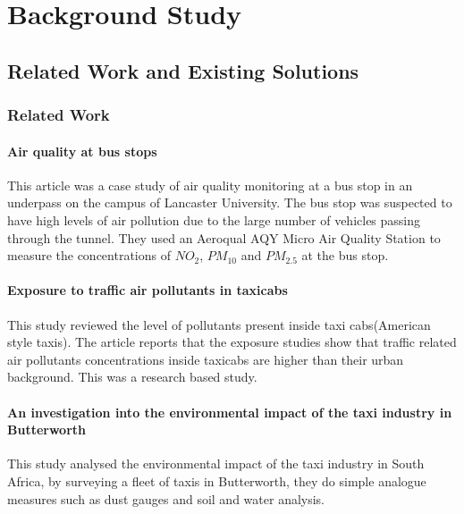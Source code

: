 \chapter{Background Study}



\section{Related Work and Existing Solutions}
\subsection{Related Work}

\subsubsection{Air quality at bus stops \cite{busstop}}
This article was a case study of air quality monitoring at a bus stop in an underpass on the campus of Lancaster University. The bus stop was suspected to have high levels of air pollution due to the large number of vehicles passing through the tunnel. They used an Aeroqual AQY Micro Air Quality Station to measure the concentrations of $NO_2$, $PM_{10}$ and $PM_{2.5}$ at the bus stop. 




\subsubsection{Exposure to traffic air pollutants in taxicabs \cite{insidetaxismall}}
This study reviewed the level of pollutants present inside taxi cabs(American style taxis). The article reports that the exposure studies show that traffic related air pollutants concentrations inside taxicabs are higher than their urban background. This was a research based study.

\subsubsection{An investigation into the environmental impact of the taxi industry in Butterworth \cite{Environmentalimpact}}
This study analysed the environmental impact of the taxi industry in South Africa, by surveying a fleet of taxis in Butterworth, they do simple analogue measures such as dust gauges and soil and water analysis. 


